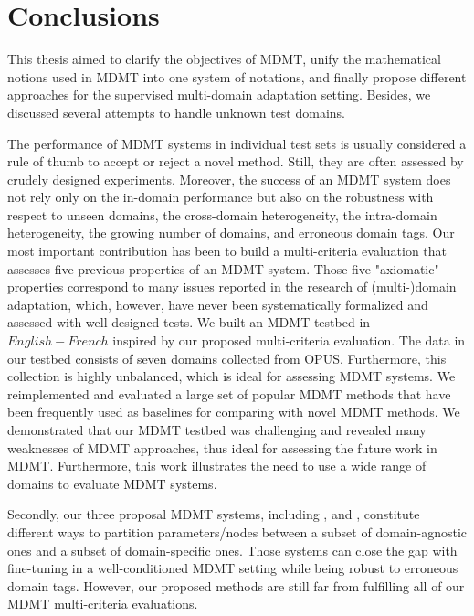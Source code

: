 \chapter{Conclusions}
\label{chap:conclusion}
This thesis aimed to clarify the objectives of MDMT, unify the mathematical notions used in MDMT into one system of notations, and finally propose different approaches for the supervised multi-domain adaptation setting. Besides, we discussed several attempts to handle unknown test domains.

The performance of MDMT systems in individual test sets is usually considered a rule of thumb to accept or reject a novel method. Still, they are often assessed by crudely designed experiments. Moreover, the success of an MDMT system does not rely only on the in-domain performance but also on the robustness with respect to unseen domains, the cross-domain heterogeneity, the intra-domain heterogeneity, the growing number of domains, and erroneous domain tags. Our most important contribution has been to build a multi-criteria evaluation that assesses five previous properties of an MDMT system. Those five "axiomatic" properties correspond to many issues reported in the research of (multi-)domain adaptation, which, however, have never been systematically formalized and assessed with well-designed tests. We built an MDMT testbed in $English-French$ inspired by our proposed multi-criteria evaluation. The data in our testbed consists of seven domains collected from OPUS. Furthermore, this collection is highly unbalanced, which is ideal for assessing MDMT systems. We reimplemented and evaluated a large set of popular MDMT methods that have been frequently used as baselines for comparing with novel MDMT methods. We demonstrated that our MDMT testbed was challenging and revealed many weaknesses of MDMT approaches, thus ideal for assessing the future work in MDMT. Furthermore, this work illustrates the need to use a wide range of domains to evaluate MDMT systems.

Secondly, our three proposal MDMT systems, including ,  and , constitute different ways to partition parameters/nodes between a subset of domain-agnostic ones and a subset of domain-specific ones. Those systems can close the gap with fine-tuning in a well-conditioned MDMT setting while being robust to erroneous domain tags. However, our proposed methods are still far from fulfilling all of our MDMT multi-criteria evaluations.

